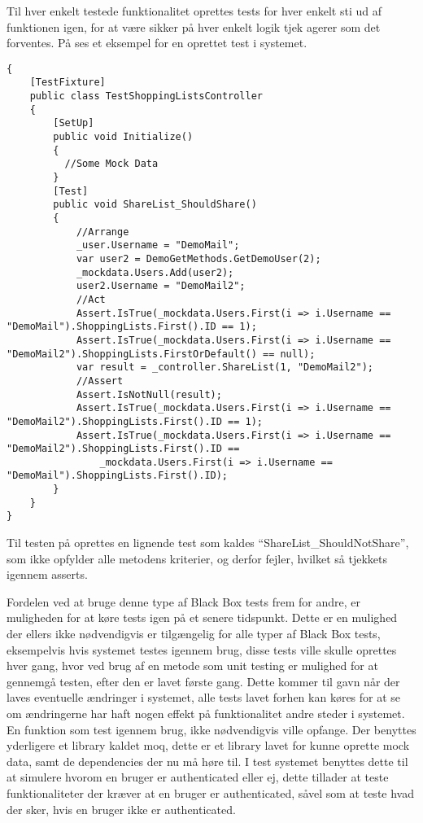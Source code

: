 Til hver enkelt testede funktionalitet oprettes tests for hver enkelt sti ud af funktionen igen, for at være sikker på hver enkelt logik tjek agerer som det forventes.
På  ses et eksempel for en oprettet test i systemet.

\begin{lstlisting}
{
    [TestFixture]
    public class TestShoppingListsController
    {
		[SetUp]
        public void Initialize()
        {
          //Some Mock Data
        }
        [Test]
        public void ShareList_ShouldShare()
        {
            //Arrange
            _user.Username = "DemoMail";
            var user2 = DemoGetMethods.GetDemoUser(2);
            _mockdata.Users.Add(user2); 
            user2.Username = "DemoMail2";
            //Act
            Assert.IsTrue(_mockdata.Users.First(i => i.Username == "DemoMail").ShoppingLists.First().ID == 1);
            Assert.IsTrue(_mockdata.Users.First(i => i.Username == "DemoMail2").ShoppingLists.FirstOrDefault() == null);
            var result = _controller.ShareList(1, "DemoMail2");
            //Assert
            Assert.IsNotNull(result);
            Assert.IsTrue(_mockdata.Users.First(i => i.Username == "DemoMail2").ShoppingLists.First().ID == 1);
            Assert.IsTrue(_mockdata.Users.First(i => i.Username == "DemoMail2").ShoppingLists.First().ID == 
                _mockdata.Users.First(i => i.Username == "DemoMail").ShoppingLists.First().ID);
        }
    }
}        
\end{lstlisting}\label{lsttest}
Til testen på  oprettes en lignende test som kaldes ``ShareList_ShouldNotShare'', som ikke opfylder alle metodens kriterier, og derfor fejler, hvilket så tjekkets igennem asserts.

Fordelen ved at bruge denne type af Black Box tests frem for andre, er muligheden for at køre tests igen på et senere tidspunkt.
Dette er en mulighed der ellers ikke nødvendigvis er tilgængelig for alle typer af Black Box tests, eksempelvis hvis systemet testes igennem brug, disse tests ville skulle oprettes hver gang, hvor ved brug af en metode som unit testing er mulighed for at gennemgå testen, efter den er lavet første gang.
Dette kommer til gavn når der laves eventuelle ændringer i systemet, alle tests lavet forhen kan køres for at se om ændringerne har haft nogen effekt på funktionalitet andre steder i systemet. 
En funktion som test igennem brug, ikke nødvendigvis ville opfange.
Der benyttes yderligere et library kaldet moq, dette er et library lavet for kunne oprette mock data, samt de dependencies der nu må høre til.
I test systemet benyttes dette til at simulere hvorom en bruger er authenticated eller ej, dette tillader at teste funktionaliteter der kræver at en bruger er authenticated, såvel som at teste hvad der sker, hvis en bruger ikke er authenticated.